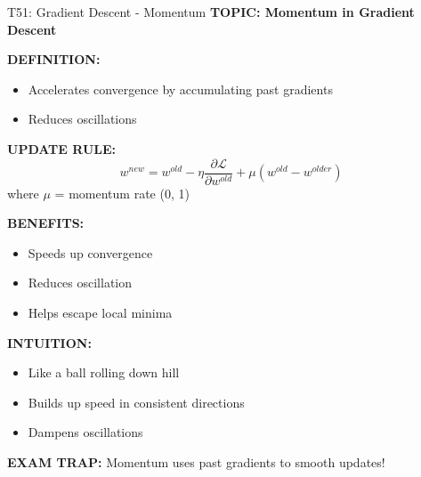 \documentclass[8pt]{beamer}
\begin{document}
	\begin{frame}{T51: Gradient Descent - Momentum}
		\fontsize{6.5}{7.5}\selectfont
		\textbf{TOPIC: Momentum in Gradient Descent}
		
		\vspace{0.1cm}
		\textbf{DEFINITION:}
		\begin{itemize}
			\item Accelerates convergence by accumulating past gradients
			\item Reduces oscillations
		\end{itemize}
		
		\vspace{0.1cm}
		\textbf{UPDATE RULE:}
		\[
		w^{new} = w^{old} - \eta \frac{\partial \mathcal{L}}{\partial w^{old}} + \mu(w^{old} - w^{older})
		\]
		where $\mu$ = momentum rate (0, 1)
		
		\vspace{0.1cm}
		\textbf{BENEFITS:}
		\begin{itemize}
			\item Speeds up convergence
			\item Reduces oscillation
			\item Helps escape local minima
		\end{itemize}
		
		\vspace{0.1cm}
		\textbf{INTUITION:}
		\begin{itemize}
			\item Like a ball rolling down hill
			\item Builds up speed in consistent directions
			\item Dampens oscillations
		\end{itemize}
		
		\textcolor{myred}{\textbf{EXAM TRAP:}} Momentum uses \textcolor{myblue}{past gradients} to smooth updates!
	\end{frame}
	
\end{document}
